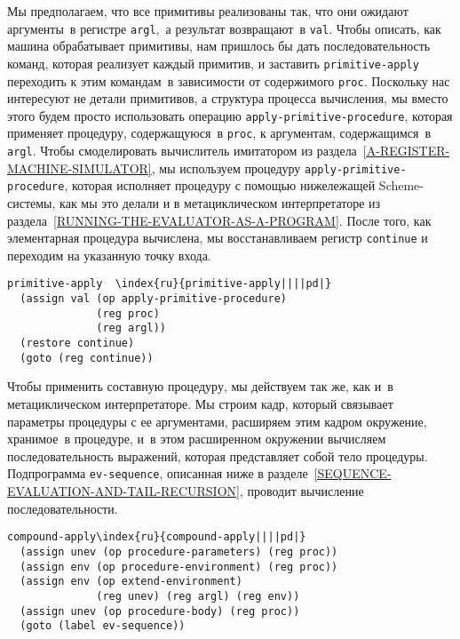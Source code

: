Мы предполагаем, что все примитивы реализованы так, что
они ожидают аргументы~в регистре {\tt argl},~а результат
возвращают~в {\tt val}.  Чтобы описать, как машина обрабатывает
примитивы, нам пришлось бы дать последовательность команд, которая
реализует каждый примитив, и заставить {\tt primitive-apply}
переходить к этим командам~в зависимости от содержимого
{\tt proc}.  Поскольку нас интересуют не детали примитивов, а
структура процесса вычисления, мы вместо этого будем просто
использовать операцию {\tt apply-primitive-procedure}, которая
применяет процедуру, содержащуюся~в {\tt proc}, к аргументам,
содержащимся~в {\tt argl}.  Чтобы смоделировать
вычислитель имитатором из 
раздела~\ref{A-REGISTER-MACHINE-SIMULATOR}, мы используем
процедуру {\tt apply-primitive-procedure}, которая исполняет
процедуру с помощью нижележащей Scheme-системы, как мы это делали и в
метациклическом интерпретаторе из
раздела~\ref{RUNNING-THE-EVALUATOR-AS-A-PROGRAM}.  После того, как
элементарная процедура вычислена, мы восстанавливаем  регистр
{\tt continue} и переходим на указанную точку входа.

\begin{Verbatim}[fontsize=\small]
primitive-apply  \index{ru}{primitive-apply||||pd|}
  (assign val (op apply-primitive-procedure)
              (reg proc)
              (reg argl))
  (restore continue)
  (goto (reg continue))
\end{Verbatim}

Чтобы применить  составную
процедуру, мы действуем так же, 
как и~в метациклическом интерпретаторе.   Мы строим кадр, который
связывает параметры процедуры с ее аргументами, расширяем этим кадром
окружение, хранимое~в процедуре, и~в этом расширенном окружении
вычисляем последовательность выражений, которая представляет собой
тело процедуры.  Подпрограмма {\tt ev-sequence}, описанная ниже
в разделе~\ref{SEQUENCE-EVALUATION-AND-TAIL-RECURSION},
проводит вычисление последовательности.

\begin{Verbatim}[fontsize=\small]
compound-apply\index{ru}{compound-apply||||pd|}
  (assign unev (op procedure-parameters) (reg proc))
  (assign env (op procedure-environment) (reg proc))
  (assign env (op extend-environment)
              (reg unev) (reg argl) (reg env))
  (assign unev (op procedure-body) (reg proc))
  (goto (label ev-sequence))
\end{Verbatim}

